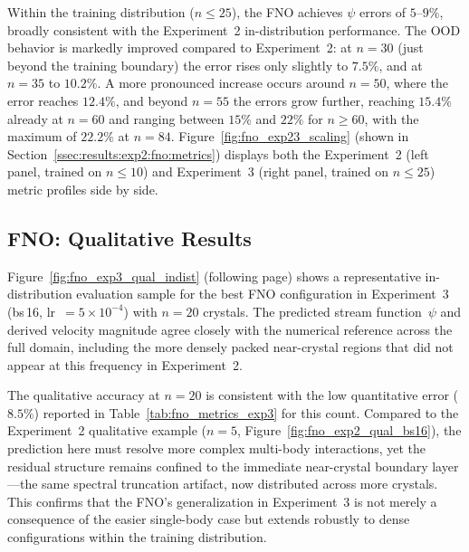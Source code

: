 Within the training distribution ($n \leq 25$), the FNO achieves $\psi$ errors of $5$–$9\%$, broadly consistent with the Experiment~2 in-distribution performance. The OOD behavior is markedly improved compared to Experiment~2: at $n = 30$ (just beyond the training boundary) the error rises only slightly to $7.5\%$, and at $n = 35$ to $10.2\%$. A more pronounced increase occurs around $n = 50$, where the error reaches $12.4\%$, and beyond $n = 55$ the errors grow further, reaching $15.4\%$ already at $n = 60$ and ranging between $15\%$ and $22\%$ for $n \geq 60$, with the maximum of $22.2\%$ at $n = 84$. Figure~\ref{fig:fno_exp23_scaling} (shown in Section~\ref{ssec:results:exp2:fno:metrics}) displays both the Experiment~2 (left panel, trained on $n \leq 10$) and Experiment~3 (right panel, trained on $n \leq 25$) metric profiles side by side.

\subsection{FNO: Qualitative Results}
\label{ssec:results:exp3:fno:qualitative}

Figure~\ref{fig:fno_exp3_qual_indist} (following page) shows a representative in-distribution evaluation sample for the best FNO configuration in Experiment~3 (bs\,16, lr~$=5\times10^{-4}$) with $n = 20$ crystals. The predicted stream function~$\psi$ and derived velocity magnitude agree closely with the numerical reference across the full domain, including the more densely packed near-crystal regions that did not appear at this frequency in Experiment~2.

The qualitative accuracy at $n = 20$ is consistent with the low quantitative error ($8.5\%$) reported in Table~\ref{tab:fno_metrics_exp3} for this count. Compared to the Experiment~2 qualitative example ($n = 5$, Figure~\ref{fig:fno_exp2_qual_bs16}), the prediction here must resolve more complex multi-body interactions, yet the residual structure remains confined to the immediate near-crystal boundary layer—the same spectral truncation artifact, now distributed across more crystals. This confirms that the FNO's generalization in Experiment~3 is not merely a consequence of the easier single-body case but extends robustly to dense configurations within the training distribution.

